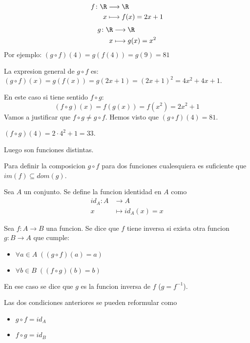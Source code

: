\begin{example}
	\[
		\begin{aligned}
			f \colon \R & \longrightarrow \R          \\
			x           & \longmapsto f (x ) = 2x + 1
		\end{aligned}
	\]
	\[
		\begin{aligned}
			g \colon \R & \longrightarrow \R         \\
			x           & \longmapsto g (x ) = x^{2}
		\end{aligned}
	\]
	Por ejemplo: \((g \circ f)(4) = g(f(4)) = g(9) = 81\)

	La expresion general de \(g \circ  f \) es: \((g \circ f)(x) = g(f(x)) = g(2x + 1) = (2x+1)^{2} = 4x^{2} + 4x + 1  \).

	En este caso si tiene sentido \(f \circ  g \):
	\[
		(f \circ g)(x) = f(g(x)) = f(x^{2}) = 2x^{2} + 1
	\]
	Vamos a justificar que \(f \circ  g \neq g \circ  f \). Hemos visto que \((g \circ f)(4) = 81 \).

	\((f \circ g)(4) = 2 \cdot 4^{2} + 1 = 33\).

	Luego son funciones distintas.
\end{example}

\begin{remark}
	Para definir la composicion \(g \circ f \) para dos funciones cualesquiera es suficiente que \(im(f) \subseteq dom(g )\).
\end{remark}

\begin{definition}
	Sea \(A \) un conjunto. Se define la funcion identidad en \(A \) como
	\[
		\begin{aligned}
			id_A \colon A & \longrightarrow A         \\
			x             & \longmapsto id_A (x ) = x
		\end{aligned}
	\]

\end{definition}
\begin{definition}
	Sea \(f \colon A \to B \) una funcion. Se dice que \(f \) tiene inversa si exista otra funcion \(g \colon  B \to A\) que cumple:
	\begin{itemize}
		\item \(\forall a \in A \; ((g \circ f)(a) = a )\)
		\item \(\forall b \in B \; ((f \circ g)(b) = b )\)

	\end{itemize}
	En ese caso se dice que \(g \) es la funcion inversa de \(f \) (\(g = f^{-1} \)).
\end{definition}
\begin{remark}
	Las dos condiciones anteriores se pueden reformular como
	\begin{itemize}
		\item \(g \circ  f = id_A\)
		\item \(f \circ g  = id_B \)
	\end{itemize}
\end{remark}

